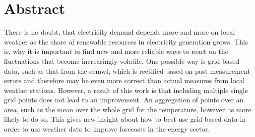 
\chapter*{Abstract}

\begin{center}
  \begin{minipage}{12cm}
    \begin{sloppypar}
    	There is no doubt, that electricity demand depends more and more on local weather as the share of renewable resources in electricity generation grows. This is, why it is important to find new and more reliable ways to react on the fluctuations that become increasingly volatile. One possible way is grid-based data, such as that from the \gls{ecmwf}, which is rectified based on past measurement errors and therefore may be even more correct than actual measures from local weather stations. However, a result of this work is that including multiple single grid points does not lead to an improvement. An aggregation of points over an area, such as the mean over the whole grid for the temperature, however, is more likely to do so. This gives new insight about how to best use grid-based data in order to use weather data to improve forecasts in the energy sector.
    \end{sloppypar}
  \end{minipage}
\end{center}
